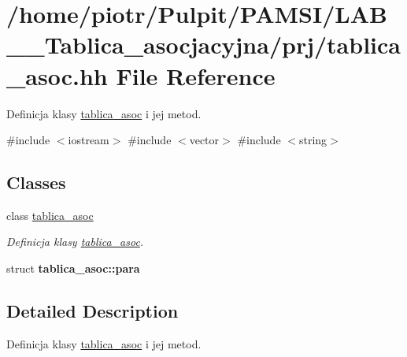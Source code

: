 \hypertarget{tablica__asoc_8hh}{\section{/home/piotr/\-Pulpit/\-P\-A\-M\-S\-I/\-L\-A\-B\-\_\-\_\-\-Tablica\-\_\-asocjacyjna/prj/tablica\-\_\-asoc.hh \-File \-Reference}
\label{tablica__asoc_8hh}
}


\-Definicja klasy \hyperlink{classtablica__asoc}{tablica\-\_\-asoc} i jej metod.  


{\ttfamily \#include $<$iostream$>$}\*
{\ttfamily \#include $<$vector$>$}\*
{\ttfamily \#include $<$string$>$}\*
\subsection*{\-Classes}
\begin{DoxyCompactItemize}
\item 
class \hyperlink{classtablica__asoc}{tablica\-\_\-asoc}
\begin{DoxyCompactList}\small\item\em \-Definicja klasy \hyperlink{classtablica__asoc}{tablica\-\_\-asoc}. \end{DoxyCompactList}\item 
struct {\bfseries tablica\-\_\-asoc\-::para}
\end{DoxyCompactItemize}


\subsection{\-Detailed \-Description}
\-Definicja klasy \hyperlink{classtablica__asoc}{tablica\-\_\-asoc} i jej metod. 